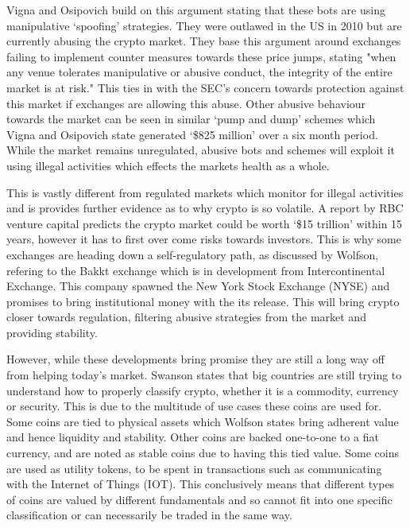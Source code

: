 Vigna and Osipovich build on this argument stating that these bots are using manipulative `spoofing' strategies. They were outlawed in the US in 2010 but are currently abusing the crypto market. They base this argument around exchanges failing to implement counter measures towards these price jumps, stating "when any venue tolerates manipulative or abusive conduct, the integrity of the entire market is at risk." This ties in with the SEC's concern towards protection against this market if exchanges are allowing this abuse. Other abusive behaviour towards the market can be seen in similar `pump and dump' schemes which Vigna and Osipovich state generated `\$825 million' over a six month period. While the market remains unregulated, abusive bots and schemes will exploit it using illegal activities which effects the markets health as a whole.

This is vastly different from regulated markets which monitor for illegal activities \cite{VIGNA} and is provides further evidence as to why crypto is so volatile. A report by RBC venture capital predicts the crypto market could be worth `\$15 trillion' within 15 years, however it has to first over come risks towards investors. This is why some exchanges are heading down a self-regulatory path, as discussed by Wolfson, refering to the Bakkt exchange which is in development from Intercontinental Exchange. This company spawned the New York Stock Exchange (NYSE) and promises to bring institutional money with the its release. This will bring crypto closer towards regulation, filtering abusive strategies from the market and providing stability.

However, while these developments bring promise they are still a long way off from helping today's market. Swanson states that big countries are still trying to understand how to properly classify crypto, whether it is a commodity, currency or security. This is due to the multitude of use cases these coins are used for. Some coins are tied to physical assets which Wolfson states bring adherent value and hence liquidity and stability. Other coins are backed one-to-one to a fiat currency, and are noted as stable coins due to having this tied value. Some coins are used as utility tokens, to be spent in transactions such as communicating with the Internet of Things (IOT). This conclusively means that different types of coins are valued by different fundamentals and so cannot fit into one specific classification or can necessarily be traded in the same way.

